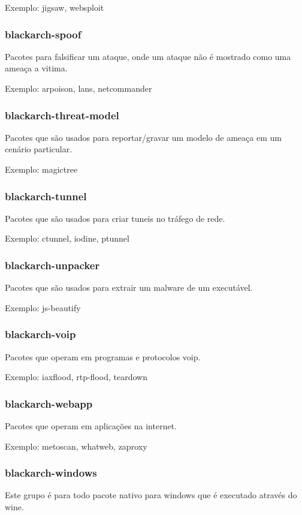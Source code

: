 \documentclass[a4paper, oneside, 11pt]{book}
\begin{document}
Exemplo: jigsaw, websploit

\subsubsection{blackarch-spoof}
Pacotes para falsificar um ataque, onde um ataque não é mostrado como uma ameaça a vitima.

Exemplo: arpoison, lans, netcommander

\subsubsection{blackarch-threat-model}
Pacotes que são usados para reportar/gravar um modelo de ameaça em um cenário particular.

Exemplo: magictree

\subsubsection{blackarch-tunnel}
Pacotes que são usados para criar tuneis no tráfego de rede.

Exemplo: ctunnel, iodine, ptunnel

\subsubsection{blackarch-unpacker}
Pacotes que são usados para extrair um malware de um executável.

Exemplo: js-beautify

\subsubsection{blackarch-voip}
Pacotes que operam em programas e protocolos voip.

Exemplo: iaxflood, rtp-flood, teardown

\subsubsection{blackarch-webapp}
Pacotes que operam em aplicações na internet.

Exemplo: metoscan, whatweb, zaproxy

\subsubsection{blackarch-windows}

Este grupo é para todo pacote nativo para windows que é executado através do wine.
\end{document}
